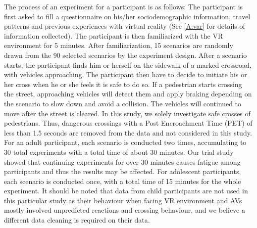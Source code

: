 The process of an experiment for a participant is as follows: The participant is first asked to fill a questionnaire on his/her sociodemographic information, travel patterns and previous experiences with virtual reality (See \cref{A:var} for details of information collected). The participant is then familiarized with the VR environment for 5 minutes. After familiarization, 15 scenarios are randomly drawn from the 90 selected scenarios by the experiment design. After a scenario starts, the participant finds him or herself on the sidewalk of a marked crossroad, with vehicles approaching. The participant then have to decide to initiate his or her cross when he or she feels it is safe to do so. If a pedestrian starts crossing the street, approaching vehicles will detect them and apply braking depending on the scenario to slow down and avoid a collision. The vehicles will continued to move after the street is cleared. In this study, we solely investigate safe crosses of pedestrians. Thus, dangerous crossings with a Post Encroachment Time (PET) of less than 1.5 seconds are removed from the data and not considered in this study. For an adult participant, each scenario is conducted two times, accumulating to 30 total experiments with a total time of about 30 minutes. Our trial study showed that continuing experiments for over 30 minutes causes fatigue among participants and thus the results may be affected. For adolescent participants, each scenario is conducted once, with a total time of 15 minutes for the whole experiment. It should be noted that data from child participants are not used in this particular study as their behaviour when facing VR environment and AVs mostly involved unpredicted reactions and crossing behaviour, and we believe a different data cleaning is required on their data. 
